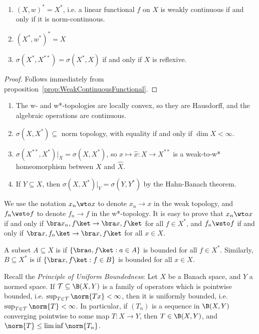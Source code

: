 \documentclass[a4paper]{article}
\begin{document}
\begin{nprop}\label{prop:WeakTopologyFunctional}
	\begin{enumerate}[label=(\roman*)]
		\item $(X,w)^*=X^*$, i.e. a linear functional $f$ on $X$ is weakly continuous if and only if it is norm-continuous.
		\item $(X^*,w^*)^*=X$
		\item $\sigma(X^*,X^{**})=\sigma(X^*,X)$ if and only if $X$ is reflexive.
	\end{enumerate}
\end{nprop}

\begin{proof}
  Follows immediately from proposition~\ref{prop:WeakContinuousFunctional}.
\end{proof}

\begin{remark}
	\begin{enumerate}[label=(\arabic*)]
		\item The w- and w*-topologies are locally convex, so they are Hausdorff, and the algebraic operations are continuous.
		\item $\sigma(X,X^*)\subseteq$ norm topology, with equality if and only if $\dim X<\infty$.
		\item $\sigma(X^{**},X^*)|_X=\sigma(X,X^*)$, so $x\mapsto\hat{x}:X\to X^{**}$ is a weak-to-w* homeomorphism between $X$ and $\widehat{X}$.
		\item If $Y\subseteq X$, then $\sigma(X,X^*)|_Y=\sigma(Y,Y^*)$ by the Hahn-Banach theorem.
	\end{enumerate}
\end{remark}

We use the notation $x_n\wto x$ to denote $x_n\to x$ in the weak topology, and $f_n\wsto f$ to denote $f_n\to f$ in the w*-topology. It is easy to prove that $x_n\wto x$ if and only if $\bra x_n,f\ket\to\bra x,f\ket$ for all $f\in X^*$, and $f_n\wsto f$ if and only if $\bra x,f_n\ket\to\bra x,f\ket$ for all $x\in X$.

A subset $A\subseteq X$ is  if $\{\bra a,f\ket:a\in A\}$ is bounded for all $f\in X^*$. Similarly, $B\subseteq X^*$ is  if $\{\bra x,f\ket:f\in B\}$ is bounded for all $x\in X$.

Recall the \emph{Principle of Uniform Boundedness}: Let $X$ be a Banach space, and $Y$ a normed space. If $\mathcal{T}\subseteq\B(X,Y)$ is a family of operators which is pointwise bounded, i.e. $\sup_{T\in\mathcal{T}}\norm{Tx}<\infty$, then it is uniformly bounded, i.e. $\sup_{T\in\mathcal{T}}\norm{T}<\infty$. In particular, if $(T_n)$ is a sequence in $\B(X,Y)$ converging pointwise to some map $T:X\to Y$, then $T\in\B(X,Y)$, and $\norm{T}\leq\liminf\norm{T_n}$.
\end{document}
